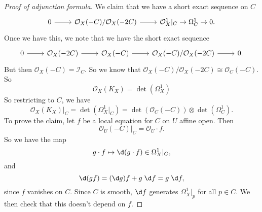 \documentclass[a4paper]{article}
\begin{document}
\begin{proof}[Proof of adjunction formula]
  We claim that we have a short exact sequence on $C$
  \[
    \begin{tikzcd}
      0 \ar[r] & \mathcal{O}_X(-C)/\mathcal{O}_X(-2C) \ar[r] & \mathcal{O}_X^1|_C \to \Omega_C^1 \to 0.
    \end{tikzcd}
  \]
  Once we have this, we note that we have the short exact sequence
  \[
    \begin{tikzcd}
      0 \ar[r] & \mathcal{O}_X(-2C) \ar[r] & \mathcal{O}_X(-C) \ar[r] & \mathcal{O}_X(-C)/\mathcal{O}_X(-2C) \ar[r] & 0.
    \end{tikzcd}
  \]
  But then $\mathcal{O}_X(-C) = \mathcal{I}_C$. So we know that $\mathcal{O}_X(-C)/\mathcal{O}_X(-2C) \cong \mathcal{O}_C(-C)$. So
  \[
    \mathcal{O}_X(K_X) = \det(\Omega_X^1)
  \]
  So restricting to $C$, we have
  \[
    \mathcal{O}_X(K_X)|_C = \det(\Omega^1_X|_C) = \det(\mathcal{O}_C(-C)) \otimes \det(\Omega^1_C).
  \]
  To prove the claim, let $f$ be a local equation for $C$ on $U$ affine open. Then
  \[
    \mathcal{O}_U(-C)|_C = \mathcal{O}_U \cdot f.
  \]
  So we have the map
  \[
    g \cdot f \mapsto \d (g \cdot f) \in \Omega^1_X|_C,
  \]
  and
  \[
    \d (gf) = (\d g)f + g\;\d f = g\;\d f,
  \]
  since $f$ vanishes on $C$. Since $C$ is smooth, $\d f$ generates $\Omega^1_X|_p$ for all $p \in C$. We then check that this doesn't depend on $f$.
\end{proof}

\printindex
\end{document}
